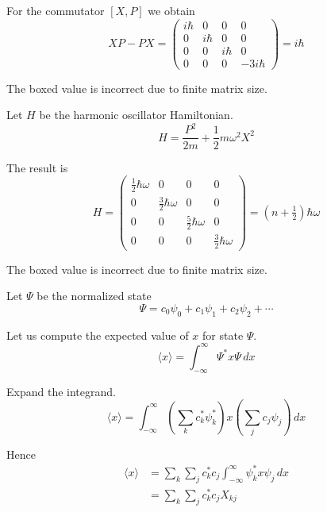 For the commutator $[X,P]$ we obtain
\begin{equation*}
XP-PX=\begin{pmatrix}
i\hbar & 0 & 0 & 0
\\
0 & i\hbar & 0 & 0
\\
0 & 0 & i\hbar & 0
\\
0 & 0 & 0 & \boxed{-3i\hbar}
\end{pmatrix}
=i\hbar
\end{equation*}

The boxed value is incorrect due to finite matrix size.

\bigskip
Let $H$ be the harmonic oscillator Hamiltonian.
\begin{equation*}
H=\frac{P^2}{2m}+\frac{1}{2}m\omega^2 X^2
\end{equation*}

The result is
\begin{equation*}
H=\begin{pmatrix}
\tfrac{1}{2}\hbar\omega & 0 & 0 & 0
\\
0 & \tfrac{3}{2}\hbar\omega & 0 & 0
\\
0 & 0 & \tfrac{5}{2}\hbar\omega & 0
\\
0 & 0 & 0 & \boxed{\tfrac{3}{2}\hbar\omega}
\end{pmatrix}
=\left(n+\tfrac{1}{2}\right)\hbar\omega
\end{equation*}

The boxed value is incorrect due to finite matrix size.

\bigskip
Let $\Psi$ be the normalized state
\begin{equation*}
\Psi=c_0\psi_0+c_1\psi_1+c_2\psi_2+\cdots
\end{equation*}

Let us compute the expected value of $x$ for state $\Psi$.
\begin{equation*}
\langle x\rangle=\int_{-\infty}^\infty \Psi^*x\Psi\,dx
\end{equation*}

Expand the integrand.
\begin{equation*}
\langle x\rangle
=\int_{-\infty}^\infty
\left(\sum_kc_k^*\psi_k^*\right) x \left(\sum_j c_j\psi_j\right)\,dx
\end{equation*}

Hence
\begin{align*}
\langle x\rangle&=\sum_k\sum_jc_k^*c_j\int_{-\infty}^\infty\psi_k^*x\psi_j\,dx
\\
&=\sum_k\sum_jc_k^*c_j X_{kj}
\end{align*}

